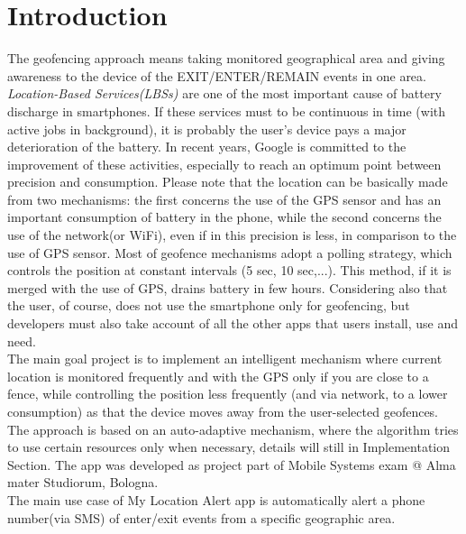 \documentclass[conference]{IEEEtran}
\begin{document}
\section{Introduction}
The geofencing approach means taking monitored geographical area and giving awareness to the device of the EXIT/ENTER/REMAIN events in one area.
\textit{Location-Based Services(LBSs)} are one of the most important cause of battery discharge in smartphones.
If these services must to be continuous in time (with active jobs in background), it is probably the user's device pays a major deterioration of the battery.
In recent years, Google is committed to the improvement of these activities, especially to reach an optimum point between precision and consumption.
Please note that the location can be basically made from two mechanisms:
the first concerns the use of the GPS sensor and has an important consumption of battery in the phone, while the second concerns the use of the network(or WiFi), 
even if in this precision is less, in comparison to the use of GPS sensor.
Most of geofence mechanisms adopt a polling strategy, which controls the position at constant intervals (5 sec, 10 sec,...). 
This method, if it is merged with the use of GPS, drains battery in few hours. 
Considering also that the user, of course, does not use the smartphone only for geofencing, but developers must also take account of all the other apps that users install, use and need.\\
The main goal project is to implement an intelligent mechanism where current location is monitored frequently and with the GPS only if you are close to a fence, 
while controlling the position less frequently (and via network, to a lower consumption) as that the device moves away from the user-selected geofences.
The approach is based on an auto-adaptive mechanism, where the algorithm tries to use certain resources only when necessary, details will still in Implementation Section.
The app was developed as project part of Mobile Systems exam @ Alma mater Studiorum, Bologna.\\
The main use case of My Location Alert app is automatically alert a phone number(via SMS) of enter/exit events from a specific geographic area. 
\end{document}
